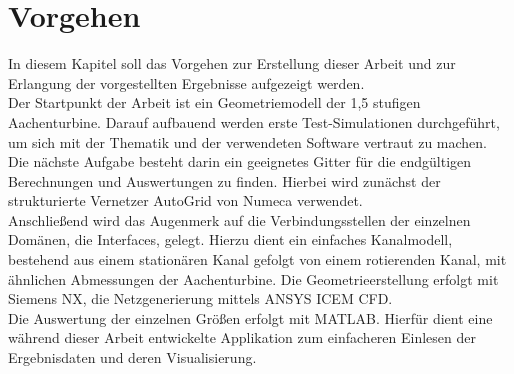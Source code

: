 \chapter{Vorgehen}
In diesem Kapitel soll das Vorgehen zur Erstellung dieser Arbeit und zur Erlangung der vorgestellten Ergebnisse aufgezeigt werden. \\
Der Startpunkt der Arbeit ist ein Geometriemodell der 1,5 stufigen Aachenturbine. Darauf aufbauend werden erste Test-Simulationen durchgeführt, um sich mit der Thematik und der verwendeten Software vertraut zu machen. Die nächste Aufgabe besteht darin ein geeignetes Gitter für die endgültigen Berechnungen und Auswertungen zu finden. Hierbei wird zunächst der strukturierte Vernetzer AutoGrid von Numeca verwendet.\\
Anschließend wird das Augenmerk auf die Verbindungsstellen der einzelnen Domänen, die Interfaces, gelegt. Hierzu dient ein einfaches Kanalmodell, bestehend aus einem stationären Kanal gefolgt von einem rotierenden Kanal, mit ähnlichen Abmessungen der Aachenturbine. Die Geometrieerstellung erfolgt mit Siemens NX, die Netzgenerierung mittels ANSYS ICEM CFD.\\ 
Die Auswertung der einzelnen Größen erfolgt mit MATLAB. Hierfür dient eine während dieser Arbeit entwickelte Applikation zum einfacheren Einlesen der Ergebnisdaten und deren Visualisierung.    


